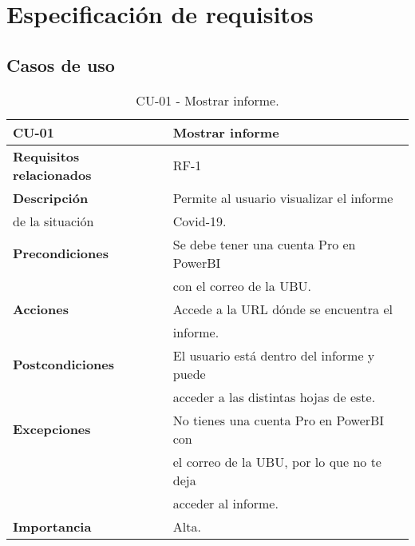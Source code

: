 \section{Especificación de requisitos}

\subsection{Casos de uso}
\begin{table}[ht!]
    \centering
    \resizebox{15cm}{!} {
    \begin{tabular}{|l|l|}
    \hline
         \textbf{CU-01}     &  \textbf{Mostrar informe} \\ \hline
         \textbf{Requisitos relacionados}       & RF-1 \\ \hline
         \textbf{Descripción}    & Permite al usuario visualizar el informe\\ de la situación &Covid-19. \\ \hline   
         \textbf{Precondiciones}      & Se debe tener una cuenta Pro en PowerBI\\&  con el correo de la UBU.\\ \hline
         \textbf{Acciones}      & Accede a la URL dónde se encuentra el \\& informe. \\ \hline
         \textbf{Postcondiciones}       & El usuario está dentro del informe y puede \\&acceder a las distintas hojas de este. \\ \hline
         \textbf{Excepciones}       & No tienes una cuenta Pro en PowerBI con\\& el correo de la UBU, por lo que no te deja\\& acceder al informe. \\ \hline
         \textbf{Importancia}   &Alta. \\
         \hline
    \end{tabular}}
    \caption{CU-01 - Mostrar informe.}
    \label{tab:my_label}
\end{table}

